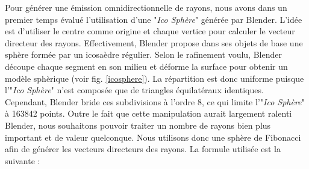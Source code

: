 Pour générer une émission omnidirectionnelle de rayons, nous avons dans un premier temps évalué l'utilisation d'une "\textit{Ico Sphère}" générée par Blender. L'idée est d'utiliser le centre comme origine et chaque vertice pour calculer le vecteur directeur des rayons. Effectivement, Blender propose dans ses objets de base une sphère formée par un icosaèdre régulier. Selon le rafinement voulu, Blender découpe chaque segment en son milieu et déforme la surface pour obtenir un modèle sphèrique (voir fig. \ref{icosphere}). La répartition est donc uniforme puisque l'"\textit{Ico Sphère}" n'est composée que de triangles équilatéraux identiques. Cependant, Blender bride ces subdivisions à l'ordre 8, ce qui limite l'"\textit{Ico Sphère}" à 163842 points. Outre le fait que cette manipulation aurait largement ralenti Blender, nous souhaitons pouvoir traiter un nombre de rayons bien plus important et de valeur quelconque. Nous utilisons donc une sphère de Fibonacci afin de générer les vecteurs directeurs des rayons. La formule utilisée est la suivante :

